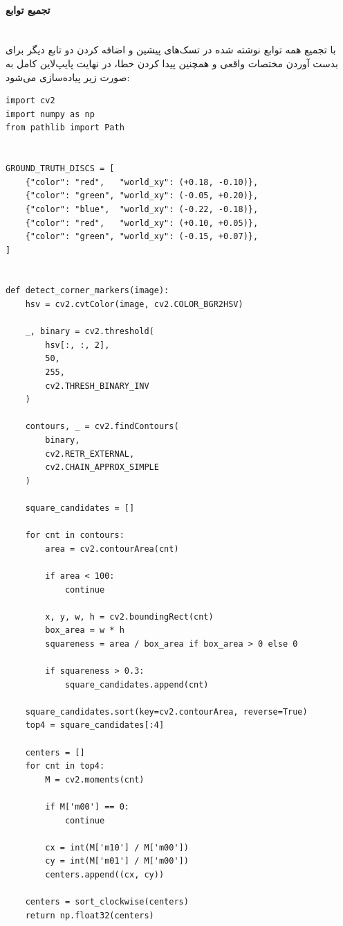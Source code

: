 \documentclass{article}
\begin{document}
\paragraph{تجمیع توابع}\mbox{}\\
با تجمیع همه توابع نوشته شده در تسک‌های پیشین و اضافه کردن دو تابع دیگر برای بدست آوردن مختصات واقعی و همچنین پیدا کردن خطا، در نهایت پایپ‌لاین کامل به صورت زیر پیاده‌سازی می‌شود:
\begin{latin}
\begin{LTR}
\begin{verbatim}
import cv2
import numpy as np
from pathlib import Path


GROUND_TRUTH_DISCS = [
    {"color": "red",   "world_xy": (+0.18, -0.10)},
    {"color": "green", "world_xy": (-0.05, +0.20)},
    {"color": "blue",  "world_xy": (-0.22, -0.18)},
    {"color": "red",   "world_xy": (+0.10, +0.05)},
    {"color": "green", "world_xy": (-0.15, +0.07)},
]


def detect_corner_markers(image):
    hsv = cv2.cvtColor(image, cv2.COLOR_BGR2HSV)
    
    _, binary = cv2.threshold(
        hsv[:, :, 2],
        50,
        255,
        cv2.THRESH_BINARY_INV
    )
    
    contours, _ = cv2.findContours(
        binary,
        cv2.RETR_EXTERNAL,
        cv2.CHAIN_APPROX_SIMPLE
    )
    
    square_candidates = []
    
    for cnt in contours:
        area = cv2.contourArea(cnt)
        
        if area < 100:
            continue
        
        x, y, w, h = cv2.boundingRect(cnt)
        box_area = w * h
        squareness = area / box_area if box_area > 0 else 0
        
        if squareness > 0.3:
            square_candidates.append(cnt)
    
    square_candidates.sort(key=cv2.contourArea, reverse=True)
    top4 = square_candidates[:4]
    
    centers = []
    for cnt in top4:
        M = cv2.moments(cnt)
        
        if M['m00'] == 0:
            continue
        
        cx = int(M['m10'] / M['m00'])
        cy = int(M['m01'] / M['m00'])
        centers.append((cx, cy))
    
    centers = sort_clockwise(centers)
    return np.float32(centers)



\end{verbatim}
\end{LTR}
\end{latin}
\end{document}
